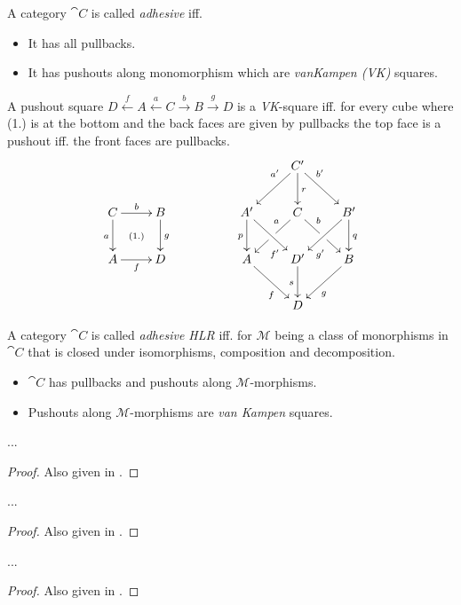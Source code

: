
\begin{mydef}
	A category $\cat{C}$ is called \emph{adhesive} iff.
	\begin{itemize}
		\item It has all pullbacks.
		\item It has pushouts along monomorphism which are \emph{vanKampen (VK)} squares.
	\end{itemize}
	A pushout square $D \overset{f}{\leftarrow} A \overset{a}{\leftarrow} C \overset{b}{\to} B \overset{g}{\to} D$ is a \emph{VK}-square iff. for every cube where (1.) is at the bottom and the back faces are given by pullbacks the top face is a pushout iff. the front faces are pullbacks.
	\[
	\xymatrix{
		& &&  & C' \ar[dr]^(0.3){b'} \ar[dl]_(0.3){a'} \ar[d]^{r} &  \\ 
		C \ar[d]_{a} \ar[r]^{b} \ar@{}[dr]|{(1.)}& B \ar[d]^{g} && A' \ar[d]_{p} \ar[dr]_(0.7){f'} & C \ar[dl]|{\hole}_(0.3){a} \ar[dr]|{\hole}^(0.3){b} & B' \ar[dl]^(0.7){g'}  \ar[d]^{q}\\ 
		A \ar[r]_{f} & D && A \ar[dr]_(0.6){f} & D' \ar[d]_{s} & B \ar[dl]^(0.6){g} \\
		&  && & D &
	}
	\]
\end{mydef}


\begin{mydef}
	A category $\cat{C}$ is called \emph{adhesive HLR} iff. for $\mathcal{M}$ being a class of monorphisms in $\cat{C}$ that is closed under isomorphisms, composition and decomposition.
	\begin{itemize}
		\item $\cat{C}$ has pullbacks and pushouts along $\mathcal{M}$-morphisms.
		\item Pushouts along $\mathcal{M}$-morphisms are \emph{van Kampen} squares.
	\end{itemize}
\end{mydef}

\begin{myprop}
...
\end{myprop}
\begin{proof}
Also given in \cite[Lemma 4]{LackSobocinski2004}.
\end{proof}

\begin{myprop}
	...
\end{myprop}
\begin{proof}
	Also given in \cite[Lemma 15]{LackSobocinski2004}.
\end{proof}

\begin{myprop}
	...
\end{myprop}
\begin{proof}
	Also given in \cite[Lemma 16]{LackSobocinski2004}.
\end{proof}
